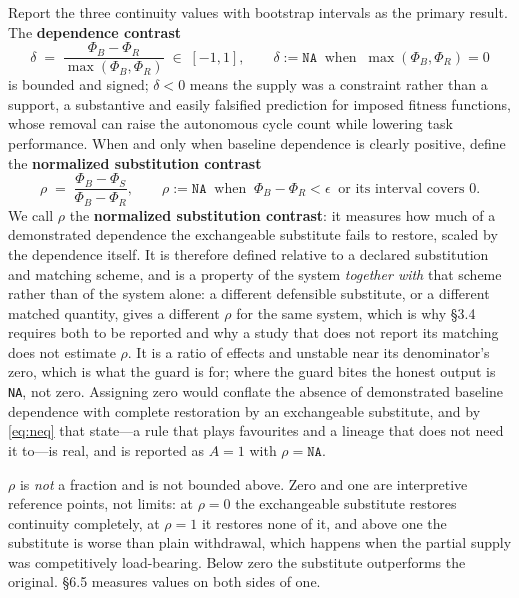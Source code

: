 \documentclass[review,3p,times]{elsarticle}
\begin{document}
Report the three continuity values with bootstrap intervals as the primary
result. The \textbf{dependence contrast}
\begin{equation}
\delta \;=\; \frac{\Phi_B-\Phi_R}{\max(\Phi_B,\Phi_R)} \;\in\; [-1,1],
\qquad
\delta := \texttt{NA} \ \text{ when } \ \max(\Phi_B,\Phi_R)=0
\label{eq:delta}
\end{equation}
is bounded and signed; $\delta<0$ means the supply was a constraint rather
than a support, a substantive and easily falsified prediction for imposed
fitness functions, whose removal can raise the autonomous cycle count while
lowering task performance. When and only when baseline dependence is
clearly positive, define the \textbf{normalized substitution contrast}
\begin{equation}
\rho \;=\; \frac{\Phi_B-\Phi_S}{\Phi_B-\Phi_R},
\qquad
\rho := \texttt{NA} \ \text{ when } \ \Phi_B-\Phi_R < \epsilon
\ \text{ or its interval covers } 0.
\label{eq:rho}
\end{equation}
We call $\rho$ the \textbf{normalized substitution contrast}: it measures how
much of a demonstrated dependence the exchangeable substitute fails to
restore, scaled by the dependence itself. It is therefore defined relative to
a declared substitution and matching scheme, and is a property of the system
\emph{together with} that scheme rather than of the system alone: a different
defensible substitute, or a different matched quantity, gives a different
$\rho$ for the same system, which is why \S3.4 requires both to be reported
and why a study that does not report its matching does not estimate $\rho$.
It is a ratio of effects and
unstable near its denominator's zero, which is what the guard is for; where
the guard bites the honest output is \texttt{NA}, not zero. Assigning zero
would conflate the absence of demonstrated baseline dependence with complete
restoration by an exchangeable substitute, and by \eqref{eq:neq} that
state---a rule that plays favourites and a lineage that does not need it
to---is real, and is reported as $A=1$ with $\rho=\texttt{NA}$.

$\rho$ is \emph{not} a fraction and is not bounded above. Zero and one are
interpretive reference points, not limits: at $\rho=0$ the exchangeable
substitute restores continuity completely, at $\rho=1$ it restores none of
it, and above one the substitute is worse than plain withdrawal, which happens
when the partial supply was competitively load-bearing. Below zero the
substitute outperforms the original. \S6.5 measures values on both sides of
one.
\end{document}
